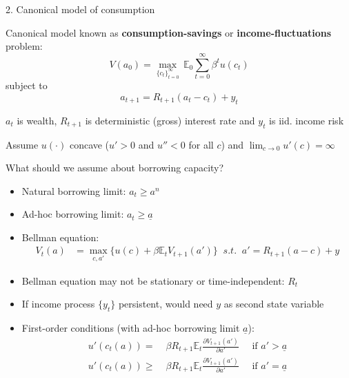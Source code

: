 \documentclass[11pt, aspectratio=169]{beamer}
\newenvironment{witemize}{\itemize\addtolength{\itemsep}{10pt}}{\enditemize}
\begin{document}
\begin{frame}{2. Canonical model of consumption}

\begin{witemize}
\item Canonical model known as \textbf{consumption-savings} or \textbf{income-fluctuations} problem:
\begin{equation*}
	V(a_0) = \max_{ \{c_t\}_{t=0}^\infty } \, \mathbb{E}_0 \sum_{t=0}^\infty \beta^t u(c_t)
\end{equation*}
subject to
\begin{equation*}
	a_{t+1} = R_{t+1} (a_t - c_t) + y_t
\end{equation*}

\item $a_t$ is wealth, $R_{t+1}$ is deterministic (gross) interest rate and $y_t$ is iid. income risk

\item Assume $u(\cdot)$ concave ($u' > 0$ and $u''< 0$ for all $c$) and $\lim_{c \to 0} u'(c) = \infty$

\item What should we assume about borrowing capacity?
\begin{itemize}
\vspace{1mm}
\item Natural borrowing limit: $a_t \geq a^n$

\item Ad-hoc borrowing limit: $a_t \geq \underline a$
\end{itemize}

\end{witemize}
\end{frame}


\begin{frame}{}
\begin{itemize}
\item Bellman equation:
\begin{align*}
	V_t(a) &= \max_{c, a'} \Big\{ u(c) + \beta \mathbb{E}_t V_{t+1}(a') \Big\} \;\; s.t. \;\; a' = R_{t+1} (a - c) + y
\end{align*}

\item Bellman equation may not be stationary or time-independent: $R_t$

\item If income process $\{y_t\}$ persistent, would need $y$ as second state variable

\item First-order conditions (with ad-hoc borrowing limit $\underline a$):
\begin{align*}
	u'(c_t(a)) = &\; \beta R_{t+1} \mathbb{E}_t \frac{\partial V_{t+1}(a')}{\partial a'} \quad \text{ if }  a' > \underline a \\
	u'(c_t(a)) \geq &\; \beta R_{t+1} \mathbb{E}_t \frac{\partial V_{t+1}(a')}{\partial a'} \quad \text{ if }  a' = \underline a
\end{align*}

\end{itemize}
\end{frame}
\end{document}
